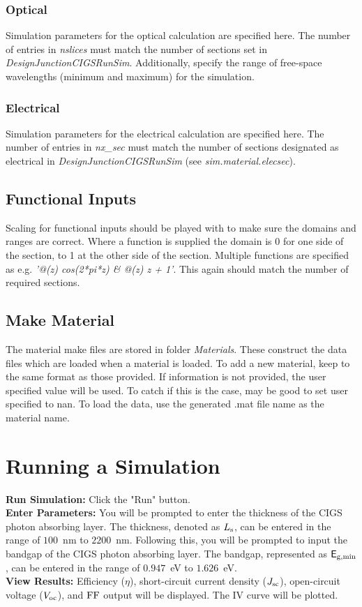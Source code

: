 \documentclass[10pt]{article}
\def\Ls{L_{\rm s}}
\def\sfE{{\sf E}}
\def\ego{\sfE_{\rm g,min}}
\def\Jsc{J_{SC}}
\def\Voc{V_{oc}}
\def\Voc{V_{OC}}
\def\Ls{L_{\rm s}}
\def\sfE{{\sf E}}
\def\ego{\sfE_{\rm g,min}}
\def\Jsc{J_{\rm sc}}
\def\FF{{\rm FF}}
\def\Voc{V_{\rm oc}}
\begin{document}
\subsubsection{Optical}
Simulation parameters for the optical calculation are specified here. The number of entries in \emph{nslices} must match the number of sections set in \emph{DesignJunctionCIGSRunSim}. Additionally, specify the range of free-space wavelengths (minimum and maximum) for the simulation.
 
\subsubsection{Electrical}
Simulation parameters for the electrical calculation are specified here. The number of entries in \emph{nx\_sec} must match the number of sections designated as electrical in \emph{DesignJunctionCIGSRunSim} (see \emph{sim.material.elecsec}).

\subsection{Functional Inputs}
Scaling for functional inputs should be played with to make sure the domains and ranges are correct. Where a function is supplied the domain is 0 for one side of the section, to 1 at the other side of the section. Multiple functions are specified as e.g. \emph{'@(z) cos(2*pi*z) \& @(z) z + 1'}. This again should match the number of required sections.


\subsection{Make Material}
The material make files are stored in folder \emph{Materials}. These construct the data files which are loaded when a material is loaded. To add a new material, keep to the same format as those provided. If information is not provided, the user specified value will be used. To catch if this is the case, may be good to set user specified to nan. To load the data, use the generated .mat file name as the material name.




\section{Running a Simulation}
\textbf{Run Simulation:} Click the "Run" button.\\
\textbf{Enter Parameters:} You will be prompted to enter the thickness of the CIGS photon absorbing layer. The thickness, denoted as $\Ls$, can be entered in the range of $100$~nm to $2200$~nm. Following this, you will be prompted to input the bandgap of the CIGS photon absorbing layer. The bandgap, represented as $\ego$, can be entered in the range of $0.947$~eV to $1.626$~eV. \\
\textbf{View Results:} Efficiency ($\eta$), short-circuit current density ($\Jsc$), open-circuit voltage ($\Voc$), and $\FF$ output will be displayed. The IV curve will be plotted.\\
\end{document}
